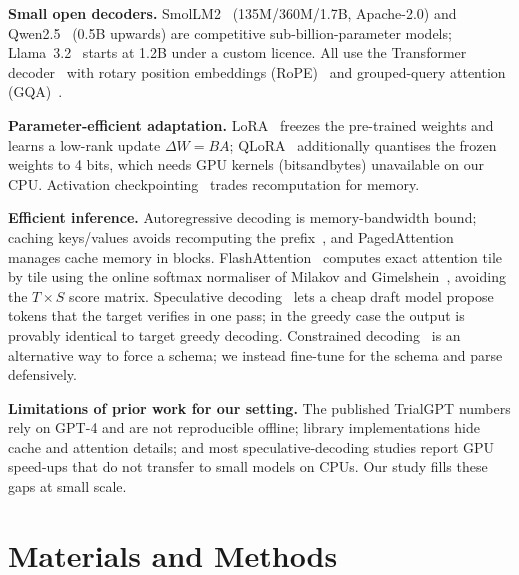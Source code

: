 \documentclass[conference]{IEEEtran}
\begin{document}
\textbf{Small open decoders.} SmolLM2~\cite{allal2025smollm2} (135M/360M/1.7B, Apache-2.0) and Qwen2.5~\cite{qwen2025qwen25} (0.5B upwards) are competitive sub-billion-parameter models; Llama~3.2~\cite{dubey2024llama3} starts at 1.2B under a custom licence. All use the Transformer decoder~\cite{vaswani2017attention} with rotary position embeddings (RoPE)~\cite{su2024roformer} and grouped-query attention (GQA)~\cite{ainslie2023gqa}.

\textbf{Parameter-efficient adaptation.} LoRA~\cite{hu2022lora} freezes the pre-trained weights and learns a low-rank update $\Delta W = BA$; QLoRA~\cite{dettmers2023qlora} additionally quantises the frozen weights to 4 bits, which needs GPU kernels (bitsandbytes) unavailable on our CPU. Activation checkpointing~\cite{chen2016training} trades recomputation for memory.

\textbf{Efficient inference.} Autoregressive decoding is memory-bandwidth bound; caching keys/values avoids recomputing the prefix~\cite{pope2023efficiently}, and PagedAttention~\cite{kwon2023pagedattention} manages cache memory in blocks. FlashAttention~\cite{dao2022flashattention} computes exact attention tile by tile using the online softmax normaliser of Milakov and Gimelshein~\cite{milakov2018online}, avoiding the $T\times S$ score matrix. Speculative decoding~\cite{leviathan2023fast,chen2023accelerating} lets a cheap draft model propose tokens that the target verifies in one pass; in the greedy case the output is provably identical to target greedy decoding. Constrained decoding~\cite{willard2023outlines} is an alternative way to force a schema; we instead fine-tune for the schema and parse defensively.

\textbf{Limitations of prior work for our setting.} The published TrialGPT numbers rely on GPT-4 and are not reproducible offline; library implementations hide cache and attention details; and most speculative-decoding studies report GPU speed-ups that do not transfer to small models on CPUs. Our study fills these gaps at small scale.

\section{Materials and Methods}
\end{document}
